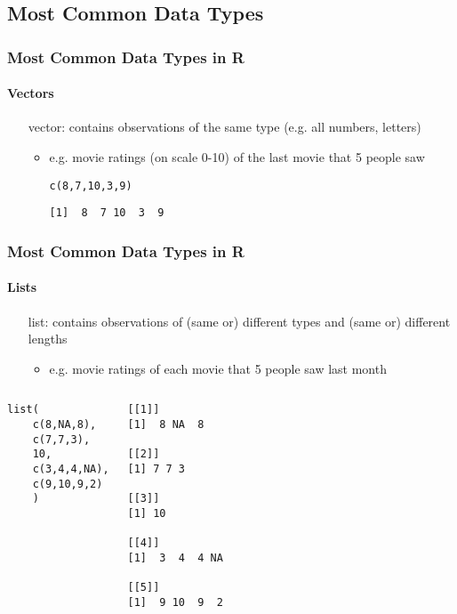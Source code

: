 \subsection{Most Common Data Types}
\begin{frame}[fragile]
	\frametitle{Most Common Data Types in R}
	\framesubtitle{Vectors}

	\begin{itemize}
		\item[vector:] contains observations of the same type (e.g. all numbers, letters)
			\begin{itemize}
				\item e.g. movie ratings (on scale 0-10) of the last movie that 5 people saw
				\begin{lstlisting}
c(8,7,10,3,9)
				\end{lstlisting} 
				\begin{verbatim}
[1]  8  7 10  3  9
				\end{verbatim}				
			\end{itemize}
	\end{itemize}
\end{frame}

\begin{frame}[fragile]
	\frametitle{Most Common Data Types in R}
	\framesubtitle{Lists}

	\begin{itemize}
		\item[list:] contains observations of (same or) different types and (same or) different lengths
			\begin{itemize}
				\item e.g. movie ratings of each movie that 5 people saw last month 
			\end{itemize}
		\end{itemize}

   \begin{columns}
		\begin{lstlisting}
list(
	c(8,NA,8),
	c(7,7,3),
	10,
	c(3,4,4,NA),
	c(9,10,9,2)
	)
		\end{lstlisting}

      \begin{center}
{ \tiny
				\begin{verbatim} 
[[1]]
[1]  8 NA  8

[[2]]
[1] 7 7 3

[[3]]
[1] 10

[[4]]
[1]  3  4  4 NA

[[5]]
[1]  9 10  9  2
			\end{verbatim} \normalsize
}
       \end{center}
     \end{columns}

\end{frame}


